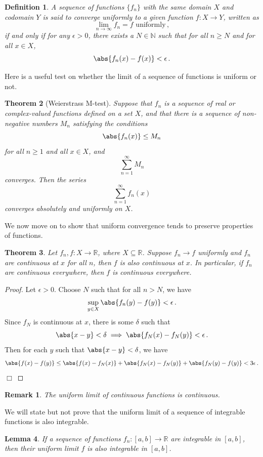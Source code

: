 \documentclass{article}
\theoremstyle{plain}\theoremheaderfont{\normalfont\itshape}\theorembodyfont{\rmfamily}\theoremseparator{.}\newtheorem*{rem}{Remark}\newtheorem*{ex}{Example}\newtheorem*{proof}{Proof}\newtheorem*{altp}{Alternative proof}
\theoremstyle{plain}\theoremheaderfont{\normalfont\bfseries}\theorembodyfont{\rmfamily}\theoremseparator{.}\newtheorem{thm}{Theorem}[section]\newtheorem{lem}[thm]{Lemma}\newtheorem{prop}[thm]{Proposition}\newtheorem*{cor}{Corollary}\newtheorem{defn}[thm]{Definition}\newtheorem{clm}[thm]{Claim}\newtheorem{clminproof}{Claim}
\theoremstyle{break}\theoremheaderfont{\normalfont\itshape}\theorembodyfont{\rmfamily}\theoremseparator{.\medskip}\newtheorem*{proofskip}{Proof}\newtheorem*{exs}{Examples}\newtheorem*{rems}{Remarks}
\theoremstyle{break}\theoremheaderfont{\normalfont\bfseries}\theorembodyfont{\rmfamily}\theoremseparator{.\medskip}\newtheorem{lemskip}[thm]{Lemma}\newtheorem{defnskip}[thm]{Definition}\newtheorem{propskip}[thm]{Proposition}\newtheorem{thmskip}[thm]{Theorem}
\numberwithin{equation}{section}
\newcommand{\qed}{\hfill\ensuremath{\Box}}
\begin{document}
	\begin{defn}
		A sequence of functions \(\{f_n\}\) with the same domain \(X\) and codomain \(Y\) is said to \textit{converge uniformly} to a given function \(f:X\to Y\), written as
		\[\lim_{n\to\infty}f_n=f\text{ uniformly}\,,\]
		if and only if for any \(\epsilon>0\), there exists a \(N\in\mathbb{N}\) such that for all \(n\ge N\) and for all \(x\in X\),
		\[\abs{f_n(x)-f(x)}<\epsilon\,.\]
	\end{defn}
	Here is a useful test on whether the limit of a sequence of functions is uniform or not.
	\begin{thm}[Weierstrass M-test]
		Suppose that \(f_n\) is a sequence of real or complex-valued functions defined on a set \(X\), and that there is a sequence of non-negative numbers \(M_n\) satisfying the conditions
		\[\abs{f_n(x)}\le M_n\] for all \(n\ge 1\) and all \(x\in X\), and
		\[\sum_{n=1}^{\infty} M_n\]
		converges. Then the series
		\[\sum_{n=1}^{\infty}f_n(x)\]
		converges absolutely and uniformly on \(X\).
	\end{thm}
	We now move on to show that uniform convergence tends to preserve properties of functions.
	\begin{thm}
		Let \(f_n,f:X\to\mathbb{R}\), where \(X\subseteq \mathbb{R}\). Suppose \(f_n\to f\) uniformly and \(f_n\) are continuous at \(x\) for all \(n\), then \(f\) is also continuous at \(x\). In particular, if \(f_n\) are continuous everywhere, then \(f\) is continuous everywhere.
	\end{thm}
	\begin{proof}
		Let \(\epsilon>0\). Choose \(N\) such that for all \(n>N\), we have
		\[\sup_{y\in X}\abs{f_n(y)-f(y)}<\epsilon\,.\]
		Since \(f_N\) is continuous at \(x\), there is some \(\delta\) such that
		\[\abs{x-y}<\delta\implies\abs{f_N(x)-f_N(y)}<\epsilon\,.\]
		Then for each \(y\) such that \(\abs{x-y}<\delta\), we have
		\[\abs{f(x)-f(y)}\le\abs{f(x)-f_N(x)}+\abs{f_N(x)-f_N(y)}+\abs{f_N(y)-f(y)}<3\epsilon\,.\]\qed
	\end{proof}
	\begin{rem}
		The uniform limit of continuous functions is continuous.
	\end{rem}
	We will state but not prove that the uniform limit of a sequence of integrable functions is also integrable.
	\begin{lem}
		If a sequence of functions \(f_n:[a,b]\to\mathbb{R}\) are integrable in \([a,b]\), then their uniform limit \(f\) is also integrable in \([a,b]\).
	\end{lem}
\end{document}
